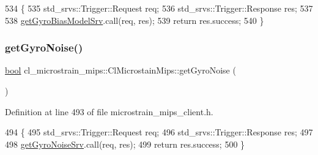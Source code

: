 \begin{DoxyCode}
534     \{
535         std\_srvs::Trigger::Request req;
536         std\_srvs::Trigger::Response res;
537 
538         \hyperlink{classcl__microstrain__mips_1_1ClMicrostainMips_a4caf935b9d839aa586b562982cfc3adb}{getGyroBiasModelSrv}.call(req, res);
539         \textcolor{keywordflow}{return} res.success;
540     \}
\end{DoxyCode}
\mbox{\label{classcl__microstrain__mips_1_1ClMicrostainMips_a7e54b1b4fb3ccdc5d2a845e52caf2f17}} 
\subsubsection{\texorpdfstring{get\+Gyro\+Noise()}{getGyroNoise()}}
{\footnotesize\ttfamily \hyperlink{classbool}{bool} cl\+\_\+microstrain\+\_\+mips\+::\+Cl\+Microstain\+Mips\+::get\+Gyro\+Noise (\begin{DoxyParamCaption}{ }\end{DoxyParamCaption})\hspace{0.3cm}{\ttfamily [inline]}}



Definition at line 493 of file microstrain\+\_\+mips\+\_\+client.\+h.


\begin{DoxyCode}
494     \{
495         std\_srvs::Trigger::Request req;
496         std\_srvs::Trigger::Response res;
497 
498         \hyperlink{classcl__microstrain__mips_1_1ClMicrostainMips_a7876569caf3e8169a1972ad8a591c772}{getGyroNoiseSrv}.call(req, res);
499         \textcolor{keywordflow}{return} res.success;
500     \}
\end{DoxyCode}
\mbox{\label{classcl__microstrain__mips_1_1ClMicrostainMips_aa138907ebb7fb634373f948028202749}} 
